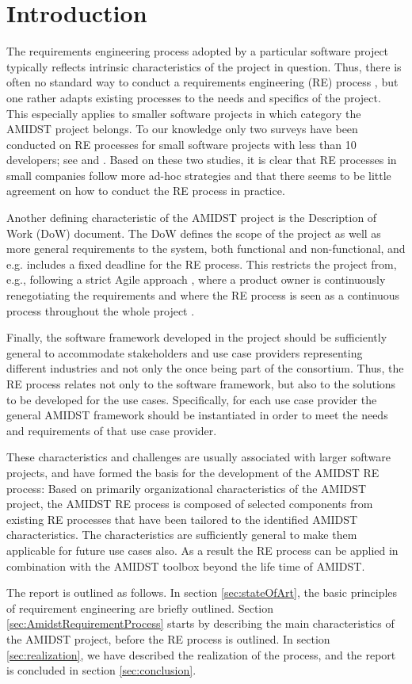 \section{Introduction}

The requirements engineering process adopted by a particular software project typically reflects intrinsic
characteristics of the project in question. Thus, there is often no standard way to conduct a requirements engineering
(RE) process \cite{Poh10}, but one rather adapts existing processes to the needs and specifics of the project. This
especially applies to smaller software projects in which category the AMIDST project belongs. To our
knowledge only two surveys have been conducted on RE processes for small software projects with less than 10 developers;
see \cite{Qui10} and \cite{Ara07}.  Based on these two studies, it is clear that RE processes in small companies follow
more ad-hoc strategies and that there seems to be little agreement on how to conduct the RE process in practice. 
 
Another defining characteristic of the AMIDST project is the Description of Work (DoW) document. The DoW defines the scope of the
project as well as more general requirements to the system, both functional and non-functional, and e.g. includes a fixed deadline
for the RE process. This restricts the project from, e.g., following a strict Agile approach
\cite{Din10}, where a product owner is continuously renegotiating the requirements and where the RE process is seen as a
continuous process throughout the whole project \cite{Kav11}.

Finally, the software framework developed in the project should be sufficiently general to accommodate stakeholders and
use case providers representing different industries and not only the once being part of the consortium. Thus, the RE
process relates not only to the software framework, but also to the solutions to be developed for the use
cases. Specifically, for each use case provider the general AMIDST framework should be instantiated in order to meet the
needs and requirements of that use case provider.    

These characteristics and challenges are usually associated with larger software projects, and have  formed
the basis for the development of the AMIDST RE process: Based on primarily organizational characteristics of the AMIDST
project, the AMIDST RE process is composed of selected components from existing RE processes that have been tailored to
the identified AMIDST characteristics. The characteristics are sufficiently general to make them
applicable for future use cases also. As a result the RE process can be applied in combination with the AMIDST
toolbox beyond the life time of AMIDST.     

The report is outlined as follows.  In section \ref{sec:stateOfArt}, the basic principles of requirement engineering are
briefly outlined.  Section \ref{sec:AmidstRequirementProcess} starts by describing the main characteristics of the
AMIDST project, before the RE process is outlined.  In section \ref{sec:realization}, we have described the realization
of the process, and the report is concluded in section \ref{sec:conclusion}. 
